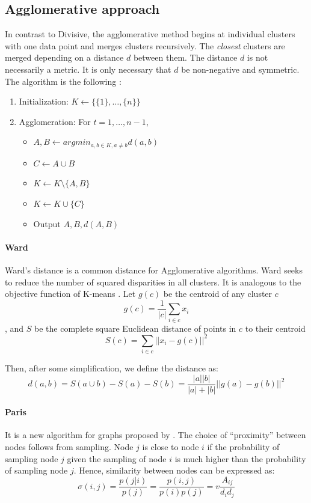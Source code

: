 \subsection{Agglomerative approach}
\label{clustering_algorithms}
In contrast to Divisive, the agglomerative method begins at individual clusters with one data point and merges clusters recursively. The \textit{closest} clusters are merged depending on a distance $d$ between them. The distance $d$ is not necessarily a metric. It is only necessary that $d$ be non-negative and symmetric. The algorithm is the following \cite{Bonald2019notes}:

\begin{enumerate}
    \item Initialization: $K \leftarrow \{\{1\}, \dots, \{n\}\}$
    \item Agglomeration: For $t=1, \dots, n-1$,
        \begin{itemize}
            \item $A,B \leftarrow argmin_{a,b \in K, a \ne b}d(a,b)$
            \item $C \leftarrow A \cup B$ 
            \item $K \leftarrow K \setminus \{A,B\}$
            \item $K \leftarrow K \cup \{C\}$
            \item Output $A,B, d(A,B)$
        \end{itemize}
\end{enumerate}


\paragraph{Ward} 
Ward's distance \cite{Ward1963} is a common distance for Agglomerative algorithms.
Ward seeks to reduce the number of squared disparities in all clusters. It is analogous to the objective function of K-means \cite{Macqueen67somemethods}. Let $g(c)$ be the centroid of any cluster $c$ $$g(c)=\frac{1}{|c|}\sum_{i \in c}x_i$$, and $S$ be the complete square Euclidean distance of points in $c$ to their centroid $$ S(c) = \sum_{i \in c}||x_i - g(c) ||^2$$

Then, after some simplification, we define the distance as: $$d(a,b)= S(a \cup b) - S(a) - S(b)=\frac{|a||b|}{|a|+|b|}||g(a)-g(b)||^2$$

\paragraph{Paris} 
It is a new algorithm for graphs proposed by \cite{Bonald2018}. The choice of “proximity” between nodes follows from sampling. Node $j$ is close to node $i$ if the probability of sampling node $j$ given the sampling of node $i$ is much higher than the probability of sampling node $j$. Hence, similarity between nodes can be expressed as: $$\sigma(i,j)=\frac{p(j|i)}{p(j)}=\frac{p(i,j)}{p(i)p(j)}=v\frac{A_{ij}}{d_i d_j} $$

